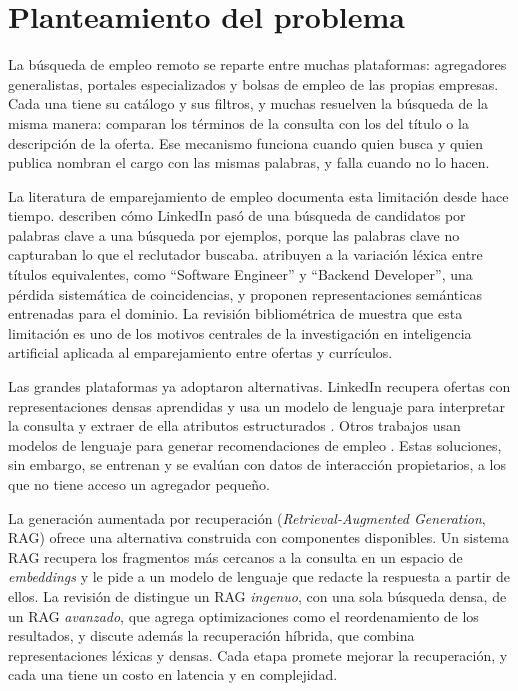 
\section{Planteamiento del problema}
\label{sec:problema}

La búsqueda de empleo remoto se reparte entre muchas plataformas: agregadores generalistas, portales especializados y bolsas de empleo de las propias empresas. Cada una tiene su catálogo y sus filtros, y muchas resuelven la búsqueda de la misma manera: comparan los términos de la consulta con los del título o la descripción de la oferta. Ese mecanismo funciona cuando quien busca y quien publica nombran el cargo con las mismas palabras, y falla cuando no lo hacen.

La literatura de emparejamiento de empleo documenta esta limitación desde hace tiempo. \citet{HaThuc2017} describen cómo LinkedIn pasó de una búsqueda de candidatos por palabras clave a una búsqueda por ejemplos, porque las palabras clave no capturaban lo que el reclutador buscaba. \citet{Bocharova2023} atribuyen a la variación léxica entre títulos equivalentes, como \enquote{Software Engineer} y \enquote{Backend Developer}, una pérdida sistemática de coincidencias, y proponen representaciones semánticas entrenadas para el dominio. La revisión bibliométrica de \citet{RojasGaleano2022} muestra que esta limitación es uno de los motivos centrales de la investigación en inteligencia artificial aplicada al emparejamiento entre ofertas y currículos.

Las grandes plataformas ya adoptaron alternativas. LinkedIn recupera ofertas con representaciones densas aprendidas \citep{Shen2024} y usa un modelo de lenguaje para interpretar la consulta y extraer de ella atributos estructurados \citep{Liu2025}. Otros trabajos usan modelos de lenguaje para generar recomendaciones de empleo \citep{ZhengGIRL2023}. Estas soluciones, sin embargo, se entrenan y se evalúan con datos de interacción propietarios, a los que no tiene acceso un agregador pequeño.

La generación aumentada por recuperación (\textit{Retrieval-Augmented Generation}, RAG) \citep{Lewis2020} ofrece una alternativa construida con componentes disponibles. Un sistema RAG recupera los fragmentos más cercanos a la consulta en un espacio de \textit{embeddings} y le pide a un modelo de lenguaje que redacte la respuesta a partir de ellos. La revisión de \citet{Gao2023} distingue un RAG \emph{ingenuo}, con una sola búsqueda densa, de un RAG \emph{avanzado}, que agrega optimizaciones como el reordenamiento de los resultados, y discute además la recuperación híbrida, que combina representaciones léxicas y densas. Cada etapa promete mejorar la recuperación, y cada una tiene un costo en latencia y en complejidad.

